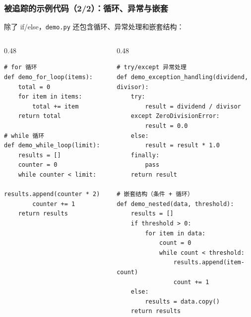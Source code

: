\documentclass[presentation,aspectratio=169,fontset=none]{ctexbeamer}
\begin{document}
\begin{frame}[fragile]
\frametitle{被追踪的示例代码（2/2）：循环、异常与嵌套}
{\footnotesize 除了 if/else，\texttt{demo.py} 还包含循环、异常处理和嵌套结构：}

\vspace{0.05cm}
\begin{columns}[T]
\begin{column}{0.48\textwidth}
{\tiny
\begin{verbatim}
# for 循环
def demo_for_loop(items):
    total = 0
    for item in items:
        total += item
    return total

# while 循环
def demo_while_loop(limit):
    results = []
    counter = 0
    while counter < limit:
        results.append(counter * 2)
        counter += 1
    return results
\end{verbatim}}
\end{column}
\begin{column}{0.48\textwidth}
{\tiny
\begin{verbatim}
# try/except 异常处理
def demo_exception_handling(dividend, divisor):
    try:
        result = dividend / divisor
    except ZeroDivisionError:
        result = 0.0
    else:
        result = result * 1.0
    finally:
        pass
    return result

# 嵌套结构（条件 + 循环）
def demo_nested(data, threshold):
    results = []
    if threshold > 0:
        for item in data:
            count = 0
            while count < threshold:
                results.append(item-count)
                count += 1
    else:
        results = data.copy()
    return results
\end{verbatim}}
\end{column}
\end{columns}
\end{frame}

\end{document}
